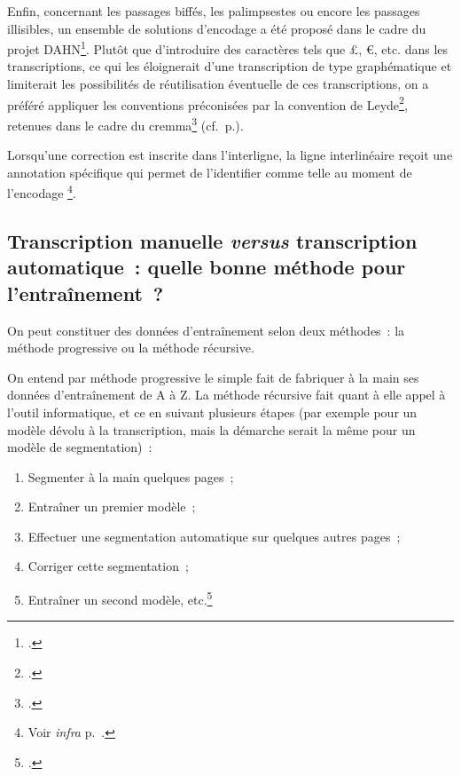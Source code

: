 \documentclass[a4paper,12pt,twoside]{book}
\begin{document}
				Enfin, concernant les passages biffés, les palimpsestes ou encore les passages illisibles, un ensemble de solutions d'encodage a été proposé dans le cadre du projet DAHN\footcite{chiffoleauFewTipsReading}. Plutôt que d'introduire des caractères tels que £, €, etc. dans les transcriptions, ce qui les éloignerait d'une transcription de type graphématique et limiterait les possibilités de réutilisation éventuelle de ces transcriptions, on a préféré appliquer les conventions préconisées par la convention de Leyde\footcite{leidenConvention}, retenues dans le cadre du \gls{cremma}\footcite{pincheSeminaireCreationModele2021a} (cf.~p.\pageref{biffes}).
				
				Lorsqu'une correction est inscrite dans l'interligne, la ligne interlinéaire reçoit une annotation spécifique qui permet de l'identifier comme telle au moment de l'encodage
				\footnote{Voir \textit{infra} p.~\pageref{interlinear}.}.
								
			\subsection[Transcription manuelle \textit{versus} transcription automatique]{Transcription manuelle \textit{versus} transcription automatique~: quelle bonne méthode pour l'entraînement~?}
				
				On peut constituer des données d'entraînement selon deux méthodes~: la méthode progressive ou la méthode récursive.
				
				On entend par méthode progressive le simple fait de fabriquer à la main ses données d'entraînement de A à Z. La méthode récursive fait quant à elle appel à l'outil informatique, et ce en suivant plusieurs étapes (par exemple pour un modèle dévolu à la transcription, mais la démarche serait la même pour un modèle de \gls{segmentation})~:
				
				\begin{enumerate}
					\item Segmenter à la main quelques pages~;
					\item Entraîner un premier modèle~;
					\item Effectuer une \gls{segmentation} automatique sur quelques autres pages~;
					\item Corriger cette \gls{segmentation}~;
					\item Entraîner un second modèle, etc.\footcite{stokesEScriptoriumVREManuscript2021}
				\end{enumerate}
				
\end{document}
